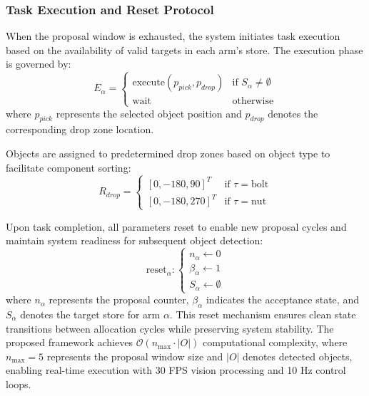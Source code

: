 \documentclass[pdflatex,sn-mathphys-num]{sn-jnl}%
\theoremstyle{thmstyleone}%
\theoremstyle{thmstylethree}%
\begin{document}
\subsubsection*{\textbf{Task Execution and Reset Protocol}}
When the proposal window is exhausted, the system initiates task execution based on the availability of valid targets in each arm's store. The execution phase is governed by:
\begin{equation}
E_\alpha =
\begin{cases}
\text{execute}(p_{pick}, p_{drop}) & \text{if } S_\alpha \neq \emptyset \\
\text{wait} & \text{otherwise}
\end{cases}
\label{eq:execution_phase}
\end{equation}
where $p_{pick}$ represents the selected object position and $p_{drop}$ denotes the corresponding drop zone location.

\noindent Objects are assigned to predetermined drop zones based on object type to facilitate component sorting: 
\begin{equation} 
 R_{drop} = 
 \begin{cases} 
 [0, -180, 90]^T & \text{if } \tau = \text{bolt} \\ 
 [0, -180, 270]^T & \text{if } \tau = \text{nut} 
 \end{cases} 
\label{eq:drop_zone} 
\end{equation}

\noindent Upon task completion, all parameters reset to enable new proposal cycles and maintain system readiness for subsequent object detection:
\begin{equation} 
\text{reset}_\alpha : 
\begin{cases} n_\alpha \leftarrow 0 \\ 
\beta_\alpha \leftarrow 1 \\ 
S_\alpha \leftarrow \emptyset 
\end{cases} 
\label{eq:reset_protocol} 
\end{equation}
where $n_{\alpha}$ represents the proposal counter, $\beta_{\alpha}$ indicates the acceptance state, and $S_{\alpha}$ denotes the target store for arm $\alpha$. This reset mechanism ensures clean state transitions between allocation cycles while preserving system stability. The proposed framework achieves $\mathcal{O}(n_{\text{max}} \cdot |O|)$ computational complexity, where ${n_\text{max}} = 5$ represents the proposal window size and $|O|$ denotes detected objects, enabling real-time execution with 30 FPS vision processing and 10 Hz control loops.
\end{document}
